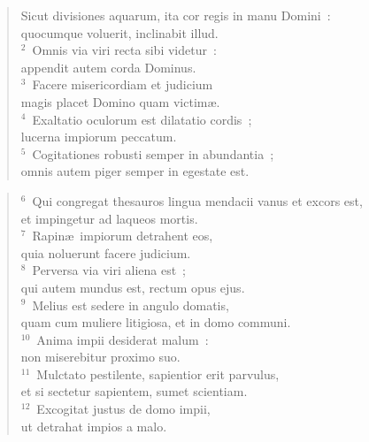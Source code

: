 \begin{flushleft}\begin{verse}\vspace{-19pt}\hspace{6pt}Sicut divisiones aquarum, ita cor regis in manu Domini~:\\\hspace{6pt} quocumque voluerit, inclinabit illud.\\
${}^{2}$~Omnis via viri recta sibi videtur~:\\ appendit autem corda Dominus.\\
${}^{3}$~Facere misericordiam et judicium\\ magis placet Domino quam victim\ae .\\
${}^{4}$~Exaltatio oculorum est dilatatio cordis~;\\ lucerna impiorum peccatum.\\
${}^{5}$~Cogitationes robusti semper in abundantia~;\\ omnis autem piger semper in egestate est.\end{verse}\end{flushleft}


\begin{flushleft}\begin{verse}${}^{6}$~Qui congregat thesauros lingua mendacii vanus et excors est,\\ et impingetur ad laqueos mortis.\\
${}^{7}$~Rapin\ae\ impiorum detrahent eos,\\ quia noluerunt facere judicium.\\
${}^{8}$~Perversa via viri aliena est~;\\ qui autem mundus est, rectum opus ejus.\\
${}^{9}$~Melius est sedere in angulo domatis,\\ quam cum muliere litigiosa, et in domo communi.\\
${}^{10}$~Anima impii desiderat malum~:\\ non miserebitur proximo suo.\\
${}^{11}$~Mulctato pestilente, sapientior erit parvulus,\\ et si sectetur sapientem, sumet scientiam.\\
${}^{12}$~Excogitat justus de domo impii,\\ ut detrahat impios a malo.\end{verse}\end{flushleft}


